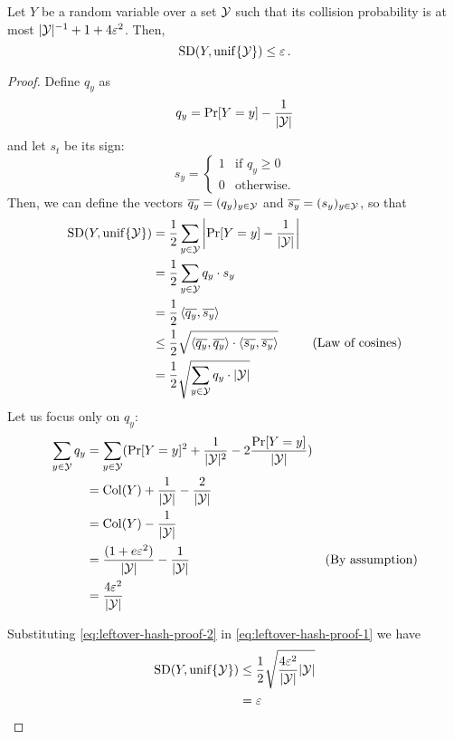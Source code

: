 \begin{lemma}\label{lem:leftover-hash-technical}
	Let $Y$ be a random variable over a set $\mathcal{Y}$ such that its collision probability is at most $|\mathcal{Y}|^{-1} + 1 + 4\varepsilon^2$. Then,
	\[
		\operatorname{SD}(Y, \operatorname{unif}\{\mathcal{Y}\}) \leq \varepsilon \, .
	\]
\end{lemma}
\begin{proof}
	Define $q_y$ as
	\[
		q_y = \Pr[Y = y] - \frac{1}{|\mathcal{Y}|}
	\]
	and let $s_t$ be its sign:
	\[
		s_y = \begin{cases}
			1 & \text{if } q_y \geq 0 \\
			0 & \text{otherwise.}
		\end{cases}
	\]
	Then, we can define the vectors $\overline{q_y} = (q_y)_{y \in \mathcal{Y}}$ and $\overline{s_y} = (s_y)_{y \in \mathcal{Y}}$, so that
	\begin{equation}\label{eq:leftover-hash-proof-1}
		\begin{aligned}[b]
			\operatorname{SD}(Y, \operatorname{unif}\{\mathcal{Y}\}) &= \frac{1}{2} \sum_{y \in \mathcal{Y}} \left|{\Pr[Y = y] - \frac{1}{|\mathcal{Y}|}}\right| & \\
			&= \frac{1}{2} \sum_{y \in \mathcal{Y}} q_{y} \cdot s_{y} & \\
			&= \frac{1}{2} \left< {\overline{q_y}}, {\overline{s_y}} \right> & \\
			&\leq \frac{1}{2} \sqrt{\left< {\overline{q_y}}, {\overline{q_y}} \right> \cdot \left< {\overline{s_y}}, {\overline{s_y}} \right>} & \text{(Law of cosines)} \\
			&= \frac{1}{2} \sqrt{\sum_{y \in \mathcal{Y}} q_y \cdot |\mathcal{Y}|}
		\end{aligned}
	\end{equation}
	Let us focus only on $q_y$:
	\begin{equation}\label{eq:leftover-hash-proof-2}
		\begin{aligned}[b]
			\sum_{y \in \mathcal{Y}} q_y &= \sum_{y \in \mathcal{Y}} (\Pr[Y = y]^2 + \frac{1}{|\mathcal{Y}|^2} - 2 \frac{\Pr[Y = y]}{|\mathcal{Y}|}) & \\
			&= \operatorname{Col}(Y) + \frac{1}{|\mathcal{Y}|} - \frac{2}{|\mathcal{Y}|} & \\
			&= \operatorname{Col}(Y) - \frac{1}{|\mathcal{Y}|} & \\
			&= \frac{(1 + e \varepsilon^2)}{|\mathcal{Y}|} - \frac{1}{|\mathcal{Y}|} & \text{(By assumption)} \\
			&= \frac{4\varepsilon^2}{|\mathcal{Y}|}
		\end{aligned}
	\end{equation}
	
	Substituting \eqref{eq:leftover-hash-proof-2} in \eqref{eq:leftover-hash-proof-1} we have
	\begin{align*}
		\operatorname{SD}(Y, \operatorname{unif}\{\mathcal{Y}\}) &\leq \frac{1}{2} \sqrt{\frac{4\varepsilon^2}{|\mathcal{Y}|} |\mathcal{Y}|} \\
		&= \varepsilon
	\end{align*}
\end{proof}

